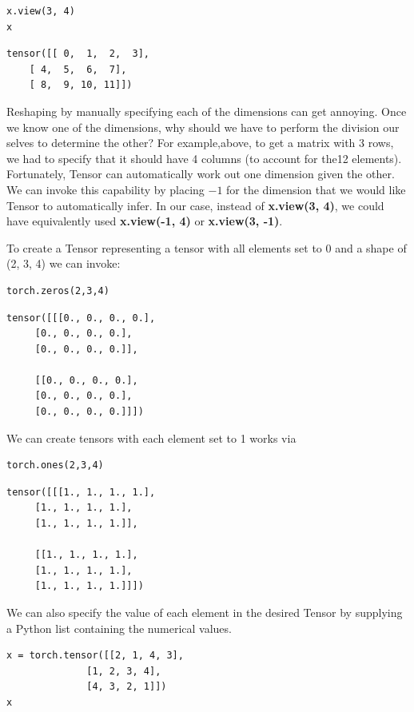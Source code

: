 \documentclass[]{article}
\begin{document}
\begin{verbatim}
x.view(3, 4)
x
\end{verbatim}

\begin{verbatim}
tensor([[ 0,  1,  2,  3],
	[ 4,  5,  6,  7],
	[ 8,  9, 10, 11]])
\end{verbatim}

Reshaping by manually specifying each of the dimensions can get annoying.  Once we know one of the dimensions, why should we have to perform the division our selves to determine the other? For example,above, to get a matrix with 3 rows, we had to specify that it should have 4 columns (to account for the12 elements). Fortunately, Tensor can automatically work out one dimension given the other. We can invoke this capability by placing $ -1 $ for the dimension that we would like Tensor to automatically infer. In our case, instead of \textbf{x.view(3, 4)}, we could have equivalently used \textbf{x.view(-1, 4)} or \textbf{x.view(3, -1)}.

To create a Tensor representing a tensor with all elements set to 0 and a shape of (2, 3, 4) we can invoke:

\begin{verbatim}
torch.zeros(2,3,4)
\end{verbatim}

\begin{verbatim}
tensor([[[0., 0., 0., 0.],
	 [0., 0., 0., 0.],
	 [0., 0., 0., 0.]],
	
	 [[0., 0., 0., 0.],
	 [0., 0., 0., 0.],
	 [0., 0., 0., 0.]]])
\end{verbatim}

We can create tensors with each element set to 1 works via

\begin{verbatim}
torch.ones(2,3,4)
\end{verbatim}

\begin{verbatim}
tensor([[[1., 1., 1., 1.],
	 [1., 1., 1., 1.],
	 [1., 1., 1., 1.]],
	
	 [[1., 1., 1., 1.],
	 [1., 1., 1., 1.],
	 [1., 1., 1., 1.]]])
\end{verbatim}

We can also specify the value of each element in the desired Tensor by supplying a Python list containing the numerical values.

\begin{verbatim}
x = torch.tensor([[2, 1, 4, 3],
	          [1, 2, 3, 4],
	          [4, 3, 2, 1]])
x
\end{verbatim}
\end{document}
